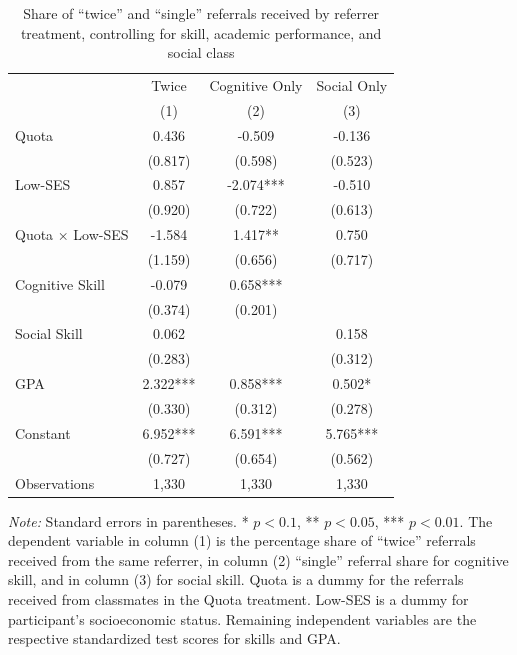 \documentclass[11pt,a4paper,oneside]{article}
\begin{document}
  \begin{table}[H]
    \centering
    \begin{threeparttable}
    \caption{Share of ``twice'' and ``single'' referrals received by referrer treatment, controlling for skill, academic performance, and social class}
    \label{tab:twice_treat}
    \begin{tabular*}{0.85\textwidth}{@{\extracolsep{\fill}}l c c c@{}}
    \toprule
    & Twice & Cognitive Only & Social Only \\
    & (1) & (2) & (3) \\
    \midrule
    Quota & 0.436 & -0.509 & -0.136 \\
    & (0.817) & (0.598) & (0.523) \\
    Low-SES & 0.857 & -2.074*** & -0.510 \\
    & (0.920) & (0.722) & (0.613) \\
    Quota × Low-SES & -1.584 & 1.417** & 0.750 \\
    & (1.159) & (0.656) & (0.717) \\
    Cognitive Skill & -0.079 & 0.658*** & \\
    & (0.374) & (0.201) & \\
    Social Skill & 0.062 & & 0.158 \\
    & (0.283) & & (0.312) \\
    GPA & 2.322*** & 0.858*** & 0.502* \\
    & (0.330) & (0.312) & (0.278) \\
    Constant & 6.952*** & 6.591*** & 5.765*** \\
    & (0.727) & (0.654) & (0.562) \\
    \midrule
    Observations & 1,330 & 1,330 & 1,330 \\
    \bottomrule
    \end{tabular*}
    \begin{tablenotes}[flushleft]
    \footnotesize
    \item[] \textit{Note:} Standard errors in parentheses. * $p < 0.1$, ** $p < 0.05$, *** $p < 0.01$. 
    The dependent variable in column (1) is the percentage share of ``twice'' referrals 
    received from the same referrer, in column (2) ``single'' referral share for cognitive 
    skill, and in column (3) for social skill. Quota is a dummy for the referrals received from classmates in the Quota treatment. Low-SES is a dummy for participant's socioeconomic status.  Remaining independent variables are the respective standardized test scores for skills and GPA.
    \end{tablenotes}
    \end{threeparttable}
    \end{table}
\end{document}

